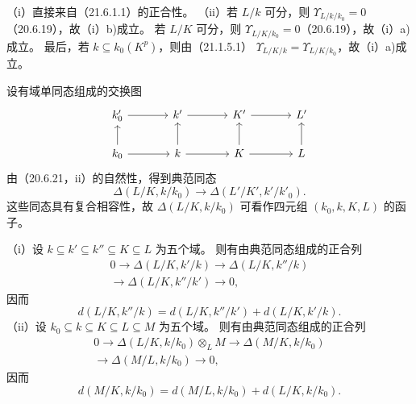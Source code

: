 \eproof
（i）直接来自（21.6.1.1）的正合性。
（ii）若 $L/k$ 可分，则 $\Upsilon_{L/k/k_0}=0$（20.6.19），故（i）b)成立。
若 $L/K$ 可分，则 $\Upsilon_{L/K/k_0}=0$（20.6.19），故（i）a)成立。
最后，若 $k\subseteq k_0(K^p)$，则由（21.1.5.1）
$\Upsilon_{L/K/k}=\Upsilon_{L/K/k_0}$，故（i）a)成立。
\finishproof

设有域单同态组成的交换图
\[
\begin{tikzcd}[column sep=large]
 k'_0\arrow[r]&k'\arrow[r]&K'\arrow[r]&L'\\
 k_0\arrow[u]\arrow[r]&k\arrow[u]\arrow[r]&K\arrow[u]\arrow[r]&L\arrow[u]
\end{tikzcd}
\]
由（20.6.21，ii）的自然性，得到典范同态
\begin{equation}
 \Delta(L/K,k/k_0)\longrightarrow\Delta(L'/K',k'/k'_0).
 \tag{21.6.3.1}
\end{equation}
这些同态具有复合相容性，故 $\Delta(L/K,k/k_0)$ 可看作四元组 $(k_0,k,K,L)$ 的函子。

（i）设 $k\subseteq k'\subseteq k''\subseteq K\subseteq L$ 为五个域。
则有由典范同态组成的正合列
\begin{equation}
\begin{split}
 0\longrightarrow\Delta(L/K,k'/k)
 \longrightarrow\Delta(L/K,k''/k)\\
 \longrightarrow\Delta(L/K,k''/k')\longrightarrow0,
\end{split}\tag{21.6.4.1}
\end{equation}
因而
\begin{equation}
 d(L/K,k''/k)=d(L/K,k''/k')+d(L/K,k'/k).
 \tag{21.6.4.2}
\end{equation}
（ii）设 $k_0\subseteq k\subseteq K\subseteq L\subseteq M$ 为五个域。
则有由典范同态组成的正合列
\begin{equation}
\begin{split}
 0\longrightarrow\Delta(L/K,k/k_0)\otimes_LM
 \longrightarrow\Delta(M/K,k/k_0)\\
 \longrightarrow\Delta(M/L,k/k_0)\longrightarrow0,
\end{split}\tag{21.6.4.3}
\end{equation}
因而
\begin{equation}
 d(M/K,k/k_0)=d(M/L,k/k_0)+d(L/K,k/k_0).
 \tag{21.6.4.4}
\end{equation}

